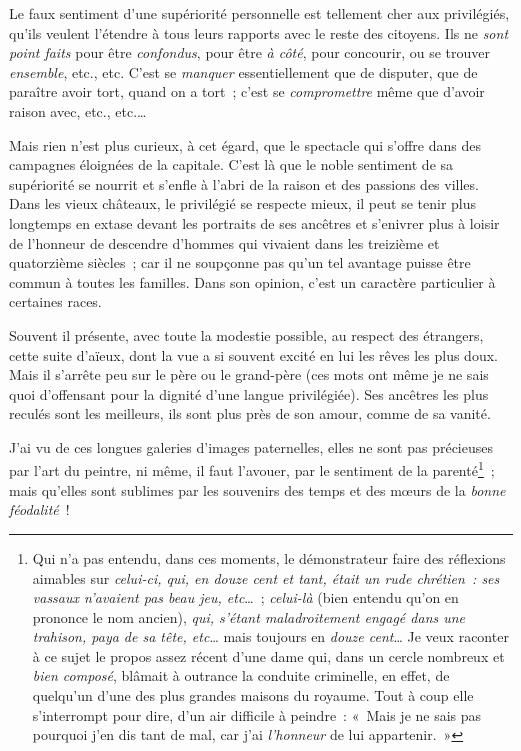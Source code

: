 \documentclass[french,twoside]{book} %
\begin{document}
Le faux sentiment d’une supériorité personnelle est tellement cher aux privilégiés, qu’ils veulent l’étendre à tous leurs rapports avec le reste des citoyens. Ils ne {\itshape sont point faits} pour être {\itshape confondus}, pour être {\itshape à côté}, pour concourir, ou se trouver {\itshape ensemble}, etc., etc. C’est se {\itshape manquer} essentiellement que de disputer, que de paraître avoir tort, quand on a tort ; c’est se {\itshape compromettre} même que d’avoir raison avec, etc., etc.…\par
Mais rien n’est plus curieux, à cet égard, que le spectacle qui s’offre dans des campagnes éloignées de la capitale. C’est là que le noble sentiment de sa supériorité se nourrit et s’enfle à l’abri de la raison et des passions des villes. Dans les vieux châteaux, le privilégié se respecte mieux, il peut se tenir plus longtemps en extase devant les portraits de ses ancêtres et s’enivrer plus à loisir de l’honneur de descendre d’hommes qui vivaient dans les treizième et quatorzième siècles ; car il ne soupçonne pas qu’un tel avantage puisse être commun à toutes les familles. Dans son opinion, c’est un caractère particulier à certaines races.\par
Souvent il présente, avec toute la modestie possible, au respect des étrangers, cette suite d’aïeux, dont la vue a si souvent excité en lui les rêves les plus doux. Mais il s’arrête peu sur le père ou le grand-père (ces mots ont même je ne sais quoi d’offensant pour la dignité d’une langue privilégiée). Ses ancêtres les plus reculés sont les meilleurs, ils sont plus près de son amour, comme de sa vanité.\par
J’ai vu de ces longues galeries d’images paternelles, elles ne sont pas précieuses par l’art du peintre, ni même, il faut l’avouer, par le sentiment de la parenté\footnote{Qui n’a pas entendu, dans ces moments, le démonstrateur faire des réflexions aimables sur {\itshape celui-ci, qui, en douze cent et tant, était un rude chrétien : ses vassaux n’avaient pas beau jeu, etc}… ; {\itshape celui-là} (bien entendu qu’on en prononce le nom ancien), {\itshape qui, s’étant maladroitement engagé dans une trahison, paya de sa tête, etc}… mais toujours en {\itshape douze cent}… Je veux raconter à ce sujet le propos assez récent d’une dame qui, dans un cercle nombreux et {\itshape bien composé}, blâmait à outrance la conduite criminelle, en effet, de quelqu’un d’une des plus grandes maisons du royaume. Tout à coup elle s’interrompt pour dire, d’un air difficile à peindre : « Mais je ne sais pas pourquoi j’en dis tant de mal, car j’ai {\itshape l’honneur} de lui appartenir. »} ; mais qu’elles sont sublimes par les souvenirs des temps et des mœurs de la {\itshape bonne féodalité} !\par
\end{document}
